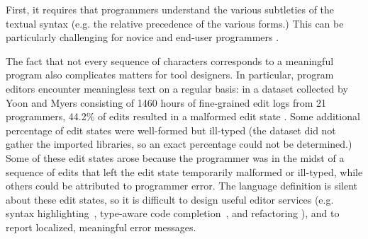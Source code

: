 
First, it requires that programmers understand the various subtleties of the textual syntax (e.g. the relative precedence of the various forms.) This can be particularly challenging for novice and end-user programmers \cite{Altadmri:2015:MCI:2676723.2677258}. %

The fact that not every sequence of characters corresponds to a meaningful program also complicates matters for tool designers. In particular, program editors encounter meaningless text on a regular basis: in a dataset collected by Yoon and Myers consisting of 1460 hours of fine-grained edit logs from 21 programmers, 44.2\% of edits resulted in a malformed edit state \cite{6883030}. Some additional percentage of edit states were well-formed but ill-typed (the dataset did not gather the imported libraries, so an exact percentage could not be determined.)  
Some of these edit states arose because the programmer was in the midst of a sequence of edits that left the edit state temporarily malformed or ill-typed, while others could be attributed to programmer error. The language definition is silent about these edit states, so it is difficult to design useful editor services (e.g. syntax highlighting~\cite{sarkar2015impact}, type-aware code completion~\cite{Mooty:2010:CCC:1915084.1916348,Omar:2012:ACC:2337223.2337324}, and refactoring ), and to report localized, meaningful error messages.

